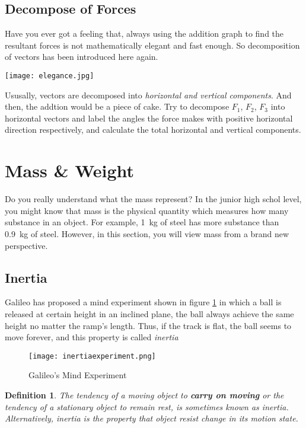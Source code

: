 \documentclass[a4paper]{tufte-handout}
\newtheorem{definition}[theorem]{Definition}%
\begin{document}
\subsection{Decompose of Forces}
Have you ever got a feeling that, always using the addition graph to find the resultant forces is not mathematically elegant and fast enough. So decomposition of vectors has been introduced here again.
\begin{marginfigure}
\texttt{[image: elegance.jpg]}
\end{marginfigure}

Ususally, vectors are decomposed into \emph{horizontal and vertical components}. And then, the addtion would be a piece of cake. Try to decompose $F_1$, $F_2$, $F_3$ into horizontal vectors and label the angles the force makes with positive horizontal direction respectively, and calculate the total horizontal and vertical components.

\section{Mass \& Weight}
Do you really understand what the mass represent? In the junior high schol level, you might know that mass is the physical quantity which measures how many substance in an object. For example, \SI{1}{\kg} of steel has more substance than \SI{0.9}{\kg} of steel. However, in this section, you will view mass from a brand new perspective.

\subsection{Inertia}
Galileo has proposed a mind experiment shown in figure \ref{fig:inertia experiment} in which a ball is released at certain height in an inclined plane, the ball always achieve the same height no matter the ramp's length. Thus, if the track is flat, the ball seems to move forever, and this property is called \emph{inertia}
\begin{figure}
\centering
\texttt{[image: inertiaexperiment.png]}
\caption{Galileo's Mind Experiment}
\label{fig:inertia experiment}
\end{figure}

\begin{definition}
The tendency of a moving object to \textbf{carry on moving} or the tendency of a stationary object to remain rest, is sometimes known as inertia. Alternatively, inertia is the property that object resist change in its motion state.
\end{definition}
\end{document}
